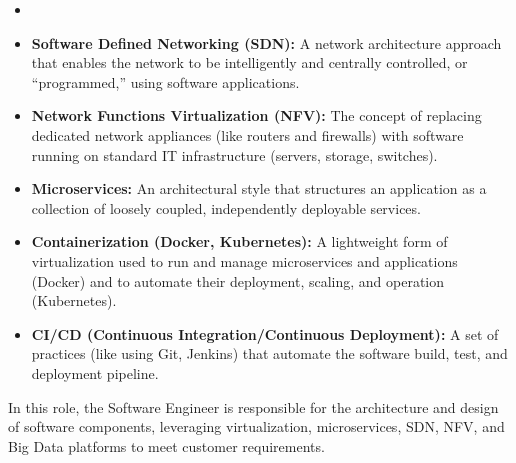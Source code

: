 \documentclass[11pt]{article}
\begin{document}
\begin{itemize}
  \item \hrulefill
  \item \textbf{Software Defined Networking (SDN):} A network architecture 
    approach that enables the network to be intelligently and centrally 
    controlled, or ``programmed,'' using software applications.
  \item \textbf{Network Functions Virtualization (NFV):} The concept of 
    replacing dedicated network appliances (like routers and firewalls) 
    with software running on standard IT infrastructure (servers, storage, 
    switches).
  \item \textbf{Microservices:} An architectural style that structures an 
    application as a collection of loosely coupled, independently 
    deployable services.
  \item \textbf{Containerization (Docker, Kubernetes):} A lightweight form of 
    virtualization used to run and manage microservices and applications 
    (Docker) and to automate their deployment, scaling, and operation 
    (Kubernetes).
  \item \textbf{CI/CD (Continuous Integration/Continuous Deployment):} A set 
    of practices (like using Git, Jenkins) that automate the software 
    build, test, and deployment pipeline.
\end{itemize}

In this role, the Software Engineer is responsible for the architecture and 
design of software components, leveraging virtualization, microservices, 
SDN, NFV, and Big Data platforms to meet customer requirements.
\end{document}
